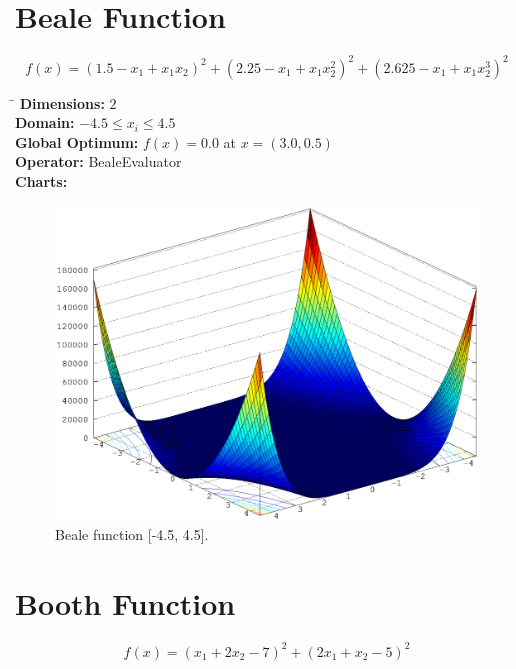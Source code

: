 \documentclass[12pt, a4paper]{article}
\begin{document}
	\newpage

	\section*{Beale Function}
		\begin{equation*}
			f(x)=(1.5-x_1+x_1x_2)^2+(2.25-x_1+x_1x_2^2)^2+(2.625 - x_1 + x_1x_2^3)^2
		\end{equation*}

		\begin{tabbing}
			\hspace{5cm}\=\kill
			\textbf{Dimensions:}     \> $2$ \\
			\textbf{Domain:}         \> $-4.5 \leq x_i \leq 4.5$ \\
			\textbf{Global Optimum:} \> $f(x) = 0.0$ at $x = (3.0, 0.5)$ \\
			\textbf{Operator:}       \> BealeEvaluator \\
			\textbf{Charts:}         \> \\
		\end{tabbing}

		\begin{figure}[ht]
			\includegraphics[width=\textwidth]{Images/Beale}
			\caption{Beale function [-4.5, 4.5].}
		\end{figure}

	\newpage

	\section*{Booth Function}
		\begin{equation*}
			f(x)=(x_1+2x_2-7)^2+(2x_1+x_2-5)^2
		\end{equation*}
\end{document}
